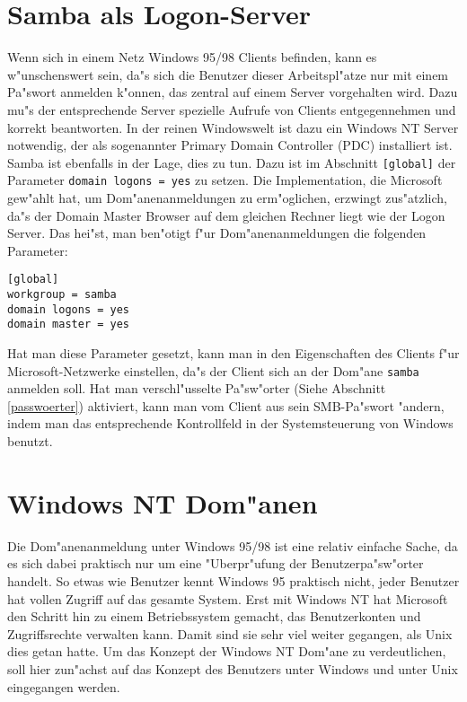 \documentclass{scrartcl}
\newcommand{\param}{\texttt}
\begin{document}
\section{Samba als Logon-Server}

Wenn sich in einem Netz Windows 95/98 Clients befinden, kann es
w"unschenswert sein, da"s sich die Benutzer dieser Arbeitspl"atze nur
mit einem Pa"swort anmelden k"onnen, das zentral auf einem Server
vorgehalten wird. Dazu mu"s der entsprechende Server spezielle Aufrufe
von Clients entgegennehmen und korrekt beantworten. In der reinen
Windowswelt ist dazu ein Windows NT Server notwendig, der als
sogenannter Primary Domain Controller (PDC) installiert ist. Samba ist
ebenfalls in der Lage, dies zu tun. Dazu ist im Abschnitt
\param{[global]} der Parameter \param{domain logons = yes} zu setzen.
Die Implementation, die Microsoft gew"ahlt hat, um Dom"anenanmeldungen
zu erm"oglichen, erzwingt zus"atzlich, da"s der Domain Master Browser
auf dem gleichen Rechner liegt wie der Logon Server. Das hei"st, man
ben"otigt f"ur Dom"anenanmeldungen die folgenden Parameter:

\begin{verbatim}
[global]
workgroup = samba
domain logons = yes
domain master = yes
\end{verbatim}

Hat man diese Parameter gesetzt, kann man in den Eigenschaften des
Clients f"ur Microsoft-Netzwerke einstellen, da"s der Client sich an
der Dom"ane \texttt{samba} anmelden soll. Hat man verschl"usselte
Pa"sw"orter (Siehe Abschnitt \ref{passwoerter}) aktiviert, kann man
vom Client aus sein SMB-Pa"swort "andern, indem man das entsprechende
Kontrollfeld in der Systemsteuerung von Windows benutzt.

\section{Windows NT Dom"anen}

Die Dom"anenanmeldung unter Windows 95/98 ist eine relativ einfache
Sache, da es sich dabei praktisch nur um eine "Uberpr"ufung der
Benutzerpa"sw"orter handelt. So etwas wie Benutzer kennt Windows 95
praktisch nicht, jeder Benutzer hat vollen Zugriff auf das gesamte
System. Erst mit Windows NT hat Microsoft den Schritt hin zu einem
Betriebssystem gemacht, das Benutzerkonten und Zugriffsrechte
verwalten kann. Damit sind sie sehr viel weiter gegangen, als Unix
dies getan hatte. Um das Konzept der Windows NT Dom"ane zu
verdeutlichen, soll hier zun"achst auf das Konzept des Benutzers unter
Windows und unter Unix eingegangen werden.
\end{document}

